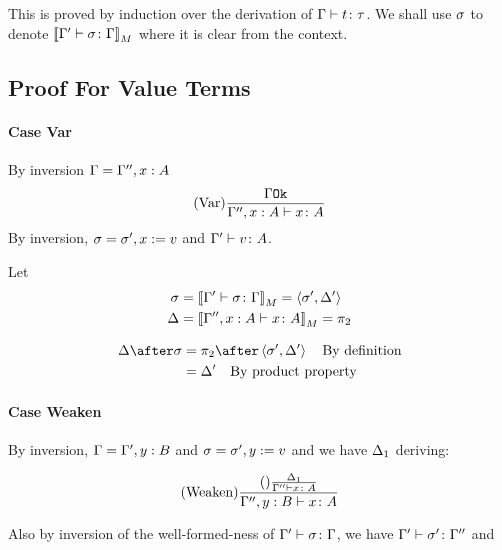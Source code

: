 {    %
    This is proved by induction over the derivation of $\Gamma \vdash t \colon \tau$.
    We shall use $\sigma$ to denote ${\bf [\![}\Gamma' \vdash \sigma \colon \Gamma{\bf ]\!]}_M$ where it is clear from the context.
    \subsection{Proof For Value Terms}
    \paragraph{Case Var}
    By inversion $\Gamma = \Gamma'', x:A$
    \begin{equation}
        (\text{Var}) \frac{\Gamma \texttt{Ok}}{\Gamma'', x:A \vdash x \colon A}
    \end{equation}
    By inversion, $\sigma = \sigma', x:= v$ and $\Gamma' \vdash v \colon A$.

    Let 
    \begin{align}
        \sigma &={\bf [\![}\Gamma' \vdash \sigma \colon \Gamma{\bf ]\!]}_M = \left\langle\sigma', \Delta'\right\rangle\\
        \Delta &={\bf [\![}\Gamma'', x:A \vdash x \colon A{\bf ]\!]}_M = \pi_2\\
    \end{align}

    \begin{align}
        \D\after\si &= \pp\after\pr{\si'}{\D'}\qt{By definition}\\
        &= \D'\qt{By product property}
    \end{align}
    \paragraph{Case Weaken}
    By inversion, $\Gamma = \Gamma', y:B$ and $\sigma = \sigma', y:= v$
    and we have $\Delta_1$ deriving:

    \begin{equation}
        (\text{Weaken}) \frac{(\text{}) \frac{\Delta_1}{\Gamma'' \vdash x \colon A}}{\Gamma'',y: B \vdash x \colon A}
    \end{equation}

    Also by inversion of the well-formed-ness of $\Gamma' \vdash \sigma \colon \Gamma$, we have $\Gamma' \vdash \sigma' \colon \Gamma''$ and 
    
}
